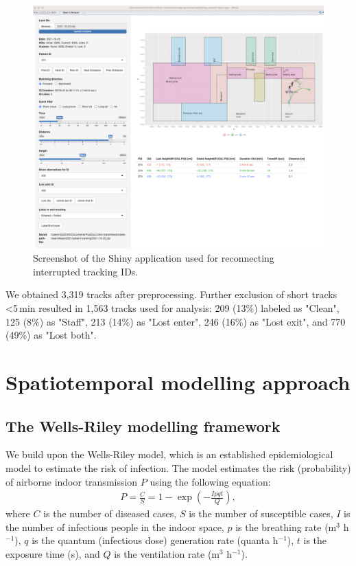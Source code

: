 \documentclass[fleqn,11pt]{wlscirep_supp}
\begin{document}
\begin{figure}[!htpb]
    \centering
    \includegraphics[width=\linewidth]{doc/paper/shiny-tool-screenshot.png}
    \caption{Screenshot of the Shiny application used for reconnecting interrupted tracking IDs.}
    \label{fig:shiny-app}
\end{figure}

We obtained 3,319 tracks after preprocessing. Further exclusion of short tracks <5\,min resulted in 1,563 tracks used for analysis: 209 (13\%) labeled as "Clean", 125 (8\%) as "Staff", 213 (14\%) as "Lost enter", 246 (16\%) as "Lost exit", and 770 (49\%) as "Lost both". 

\clearpage

\section{Spatiotemporal modelling approach}\label{sec:spattemp-model}

\subsection{The Wells-Riley modelling framework}

We build upon the Wells-Riley model\cite{Riley1961Book}, which is an established epidemiological model to estimate the risk of infection. The model estimates the risk (probability) of airborne indoor transmission $P$ using the following equation: 
\begin{align}
    P = \frac{C}{S} = 1 - \exp \left(-\frac{Ipqt}{Q}\right),
\end{align}
where $C$ is the number of diseased cases, $S$ is the number of susceptible cases, $I$ is the number of infectious people in the indoor space, $p$ is the breathing rate (m$^3$ h$^{-1}$), $q$ is the quantum (infectious dose) generation rate (quanta h$^{-1}$), $t$ is the exposure time (s), and $Q$ is the ventilation rate (m$^3$ h$^{-1}$).
\end{document}
